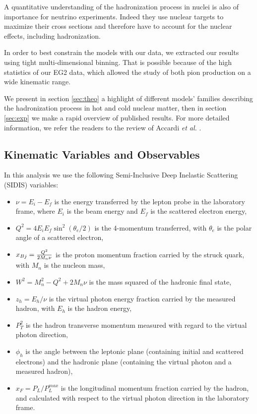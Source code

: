 A quantitative understanding of the hadronization process in nuclei is also of importance for neutrino experiments. Indeed they use nuclear targets to maximize their cross sections and therefore have to account for the nuclear effects, including hadronization. 

In order to best constrain the models with our data, we extracted our results using tight multi-dimensional binning. That is possible because of the high statistics of our EG2 data, which allowed the study of both pion production on a wide kinematic range.

We present in section \ref{sec:theo} a highlight of different models' families describing the hadronization process in hot and cold nuclear matter, then in section \ref{sec:exp} we make a rapid overview of published results. For more detailed information, we refer the readers to the review of Accardi {\it et al.} \cite{Accardi:2009qv}.


\subsection{Kinematic Variables and Observables}

In this analysis we use the following Semi-Inclusive Deep Inelastic Scattering (SIDIS) variables:
\begin{itemize}
 \item $\nu = E_i - E_f$ is the energy transferred by the lepton probe in the laboratory frame, where $E_i$ is the beam energy and $E_f$ is the scattered electron energy,
 \item $Q^2 = 4 E_i E_f \sin ^2(\theta_e / 2)$ is the 4-momentum transferred, with $\theta_e$ is the polar angle of a scattered electron,
 \item $x_{Bj} = {{Q^2} \over {2 M_n \nu}}$ is the proton momentum fraction carried by the struck quark, with $M_n$ is the nucleon mass,
 \item $W^2 = M_n^2 - Q^2 + 2 M_n \nu$ is the mass squared of the hadronic final state,
 \item $z_h = E_h / \nu$ is the virtual photon energy fraction carried by the measured hadron, with $E_h$ is the hadron energy,
 \item $P_T^2$ is the hadron transverse momentum measured with regard to the virtual photon direction,
 \item $\phi_h$ is the angle between the leptonic plane (containing initial and scattered electrons) and the hadronic plane (containing the virtual photon and a measured hadron),
 \item $x_F = P_L/P_L^{max}$ is the longitudinal momentum fraction carried by the hadron, and calculated with respect to the virtual photon direction in the laboratory frame.
\end{itemize}

